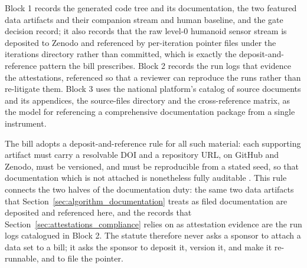 Block 1 records the generated code tree and its documentation, the two featured
data artifacts and their companion stream and human baseline, and the gate
decision record; it also records that the raw level-0 humanoid sensor stream is
deposited to Zenodo and referenced by per-iteration pointer files under the
iterations directory rather than committed, which is exactly the
deposit-and-reference pattern the bill prescribes. Block 2 records the run logs
that evidence the attestations, referenced so that a reviewer can reproduce the
runs rather than re-litigate them. Block 3 uses the national platform's catalog of
source documents and its appendices, the source-files directory and the
cross-reference matrix, as the model for referencing a comprehensive
documentation package from a single instrument.

The bill adopts a deposit-and-reference rule for all such material: each
supporting artifact must carry a resolvable DOI and a repository URL, on GitHub
and Zenodo, must be versioned, and must be reproducible from a stated seed, so
that documentation which is not attached is nonetheless fully auditable
\cite{zenodo}. This rule connects the two halves of the documentation duty: the
same two data artifacts that Section~\ref{sec:algorithm_documentation} treats as
filed documentation are deposited and referenced here, and the records that
Section~\ref{sec:attestations_compliance} relies on as attestation evidence are
the run logs catalogued in Block 2. The statute therefore never asks a sponsor to
attach a data set to a bill; it asks the sponsor to deposit it, version it, and
make it re-runnable, and to file the pointer.
